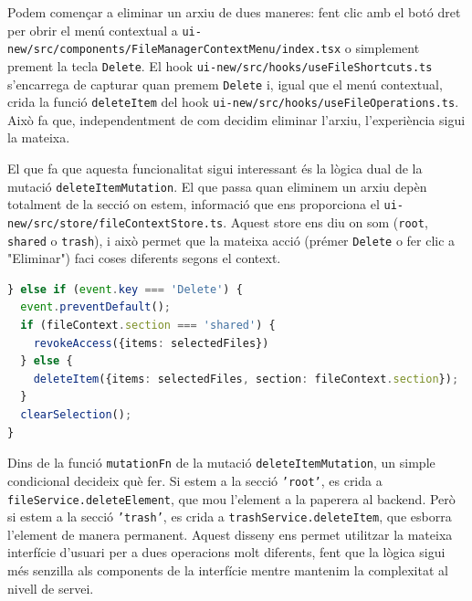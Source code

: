 Podem començar a eliminar un arxiu de dues maneres: fent clic amb el botó dret per obrir el menú contextual a \texttt{ui-new/src/components/FileManagerContextMenu/index.tsx} o simplement prement la tecla \texttt{Delete}. El hook \texttt{ui-new/src/hooks/useFileShortcuts.ts} s'encarrega de capturar quan premem \texttt{Delete} i, igual que el menú contextual, crida la funció \texttt{deleteItem} del hook \texttt{ui-new/src/hooks/useFileOperations.ts}. Això fa que, independentment de com decidim eliminar l'arxiu, l'experiència sigui la mateixa.

El que fa que aquesta funcionalitat sigui interessant és la lògica dual de la mutació \texttt{deleteItemMutation}. El que passa quan eliminem un arxiu depèn totalment de la secció on estem, informació que ens proporciona el \texttt{ui-new/src/store/fileContextStore.ts}. Aquest store ens diu on som (\texttt{root}, \texttt{shared} o \texttt{trash}), i això permet que la mateixa acció (prémer \texttt{Delete} o fer clic a "Eliminar") faci coses diferents segons el context.

\begin{lstlisting}[language=typescript, caption={Gestió de la tecla Delete a `useFileShortcuts.ts`}]
} else if (event.key === 'Delete') {
  event.preventDefault();
  if (fileContext.section === 'shared') {
    revokeAccess({items: selectedFiles})
  } else {
    deleteItem({items: selectedFiles, section: fileContext.section});
  }
  clearSelection();
}
\end{lstlisting}

Dins de la funció \texttt{mutationFn} de la mutació \texttt{deleteItemMutation}, un simple condicional decideix què fer. Si estem a la secció \texttt{'root'}, es crida a \texttt{fileService.deleteElement}, que mou l'element a la paperera al backend. Però si estem a la secció \texttt{'trash'}, es crida a \texttt{trashService.deleteItem}, que esborra l'element de manera permanent. Aquest disseny ens permet utilitzar la mateixa interfície d'usuari per a dues operacions molt diferents, fent que la lògica sigui més senzilla als components de la interfície mentre mantenim la complexitat al nivell de servei.

